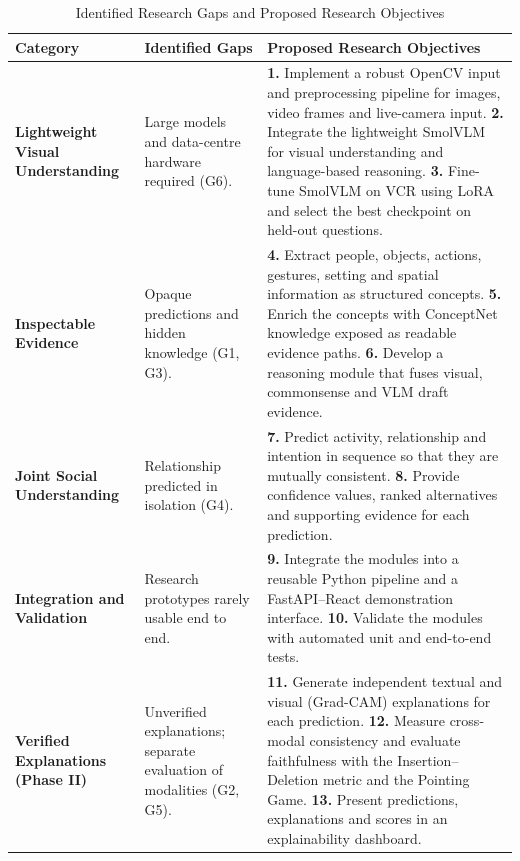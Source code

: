 \begin{table}[h!]
\centering
\caption{{Identified Research Gaps and Proposed Research Objectives}}
\label{tab:research_gaps_objectives}
\renewcommand{\arraystretch}{1.4}
\setlength{\tabcolsep}{4pt}
\small
\begin{tabularx}{\textwidth}{|p{3.4cm}|p{4.4cm}|L|}
\hline
\textbf{Category} & \textbf{Identified Gaps} & \textbf{Proposed Research Objectives} \\ \hline

\textbf{Lightweight Visual Understanding} &
Large models and data-centre hardware required (G6). &
\textbf{1.} Implement a robust OpenCV input and preprocessing pipeline for images, video frames and live-camera input.
\newline \textbf{2.} Integrate the lightweight SmolVLM for visual understanding and language-based reasoning.
\newline \textbf{3.} Fine-tune SmolVLM on VCR using LoRA and select the best checkpoint on held-out questions. \\ \hline

\textbf{Inspectable Evidence} &
Opaque predictions and hidden knowledge (G1, G3). &
\textbf{4.} Extract people, objects, actions, gestures, setting and spatial information as structured concepts.
\newline \textbf{5.} Enrich the concepts with ConceptNet knowledge exposed as readable evidence paths.
\newline \textbf{6.} Develop a reasoning module that fuses visual, commonsense and VLM draft evidence. \\ \hline

\textbf{Joint Social Understanding} &
Relationship predicted in isolation (G4). &
\textbf{7.} Predict activity, relationship and intention in sequence so that they are mutually consistent.
\newline \textbf{8.} Provide confidence values, ranked alternatives and supporting evidence for each prediction. \\ \hline

\textbf{Integration and Validation} &
Research prototypes rarely usable end to end. &
\textbf{9.} Integrate the modules into a reusable Python pipeline and a FastAPI--React demonstration interface.
\newline \textbf{10.} Validate the modules with automated unit and end-to-end tests. \\ \hline

\textbf{Verified Explanations (Phase II)} &
Unverified explanations; separate evaluation of modalities (G2, G5). &
\textbf{11.} Generate independent textual and visual (Grad-CAM) explanations for each prediction.
\newline \textbf{12.} Measure cross-modal consistency and evaluate faithfulness with the Insertion--Deletion metric and the Pointing Game.
\newline \textbf{13.} Present predictions, explanations and scores in an explainability dashboard. \\ \hline
\end{tabularx}
\end{table}
